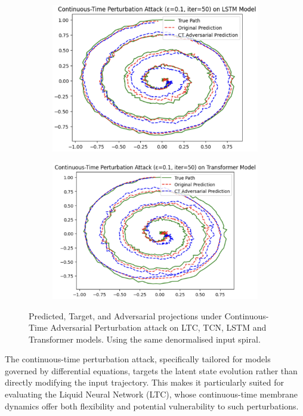 \begin{figure}[H]
\begin{subfigure}[b]{0.45\linewidth}
        \includegraphics[width=\linewidth]{img/continuous_time_spiral_lstm.png}
        \label{fig:continuous_time_spiral_lstm}
    \end{subfigure}
    \hfill
    \begin{subfigure}[b]{0.45\linewidth}
        \includegraphics[width=\linewidth]{img/continuous_time_spiral_transformer.png}
        \label{fig:continuous_time_spiral_transformer}
    \end{subfigure}
    \caption{Predicted, Target, and Adversarial projections under Continuous-Time Adversarial Perturbation attack on LTC, TCN, LSTM and Transformer models. Using the same denormalised input spiral.}
    \label{fig:continuous_time_spirals}
\end{figure}

The continuous-time perturbation attack, specifically tailored for models governed by differential equations, targets the latent state evolution rather than directly modifying the input trajectory. This makes it particularly suited for evaluating the Liquid Neural Network (LTC), whose continuous-time membrane dynamics offer both flexibility and potential vulnerability to such perturbations.

